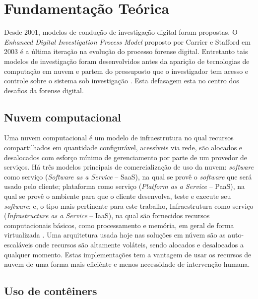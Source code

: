 \chapter{Fundamentação Teórica}
\label{chp:fundamentação}

Desde 2001, modelos de condução de investigação digital foram propostas. 
%
O \textit{Enhanced Digital Investigation Process Model} proposto por Carrier e Stafford em 2003 é a última iteração na evolução do processo forense digital.
%
Entretanto tais modelos de investigação foram desenvolvidos antes da aparição de tecnologias de computação em nuvem e partem do pressuposto que o investigador tem acesso e controle sobre o sistema sob investigação \cite{GrisposChallengesCloudComputing:2012}.
%
Esta defasagem esta no centro dos desafios da forense digital.

\section{Nuvem computacional}
\label{sec:computacaonuvem}

Uma nuvem computacional é um modelo de infraestrutura no qual recursos compartilhados em quantidade configurável, acessíveis via rede, são alocados e desalocados com esforço mínimo de gerenciamento por parte de um provedor de serviços.
%
Há três modelos principais de comercialização de uso da nuvem: \textit{software} como serviço (\textit{Software as a Service} -- SaaS), na qual se provê o \textit{software} que será usado pelo cliente; plataforma como serviço (\textit{Platform as a Service} -- PaaS), na qual se provê o ambiente para que o cliente desenvolva, teste e execute seu \textit{software}; e, o tipo mais pertinente para este trabalho, Infraestrutura como serviço (\textit{Infrastructure as a Service} -- IaaS), na qual são fornecidos recursos computacionais básicos, como processamento e memória, em geral de forma virtualizada \cite{NIST2011}.
%
Uma arquitetura usada hoje nas soluções em núvem são as auto-escaláveis onde recursos são altamente voláteis, sendo alocados e desalocados a qualquer momento. Estas implementações tem a vantagem de usar os recursos de nuvem de uma forma mais eficiênte e menos necessidade de intervenção humana.


\section{Uso de contêiners}
\label{sec:conteiner}


